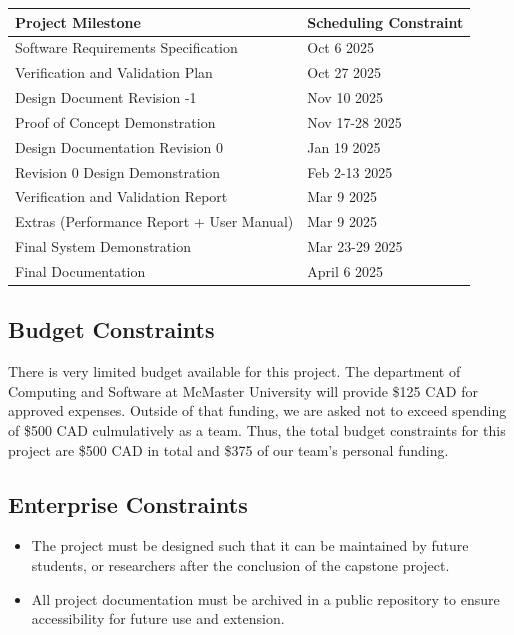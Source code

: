 \documentclass[12pt]{article}
\begin{document}
\begin{tabular}{|m{5cm}|m{10cm}|}
    \hline
    Project Milestone & Scheduling Constraint\\
    \hline
    Software Requirements Specification & Oct 6 2025\\
    \hline
    Verification and Validation Plan & Oct 27 2025\\
    \hline
    Design Document Revision -1 & Nov 10 2025\\
    \hline
    Proof of Concept Demonstration & Nov 17-28 2025\\
    \hline
    Design Documentation Revision 0 & Jan 19 2025\\
    \hline
    Revision 0 Design Demonstration & Feb 2-13 2025\\
    \hline
    Verification and Validation Report & Mar 9 2025\\
    \hline
    Extras (Performance Report + User Manual) & Mar 9 2025\\
    \hline
    Final System Demonstration & Mar 23-29 2025\\
    \hline
    Final Documentation & April 6 2025\\
    \hline
\end{tabular}




\subsection{Budget Constraints}

\par{There is very limited budget available for this project. The department of Computing and Software at McMaster University 
will provide \$125 CAD for approved expenses. Outside of that funding, we are asked not to exceed spending of \$500 CAD
culmulatively as a team. Thus, the total budget constraints for this project are \$500 CAD in total and \$375 of our team's personal funding.}

\subsection{Enterprise Constraints}

\begin{itemize}
    \item The project must be designed such that it can be maintained by future students, or researchers after the conclusion of the capstone project. 
    \item All project documentation must be archived in a public repository to ensure accessibility for future use and extension. 
\end{itemize}
\end{document}
